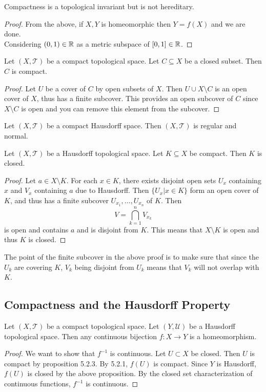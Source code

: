 \documentclass[a4paper]{article}
\begin{document}
\begin{lmm}{}{} Compactness is a topological invariant but is not hereditary. 
\begin{proof}
From the above, if $X,Y$ is homeomorphic then $Y=f(X)$ and we are done. \\
Considering $(0,1)\in\mathbb{R}$ as a metric subspace of $[0,1]\in\mathbb{R}$. 
\end{proof}
\end{lmm}

\begin{prp}{}{} Let $(X,\mathcal{T})$ be a compact topological space. Let $C\subseteq X$ be a closed subset. Then $C$ is compact. 
\begin{proof}
Let $U$ be a cover of $C$ by open subsets of $X$. Then $U\cup X\setminus C$ is an open cover of $X$, thus has a finite subcover. This provides an open subcover of $C$ since $X\setminus C$ is open and you can remove this element from the subcover. 
\end{proof}
\end{prp}

\begin{prp}{}{} Let $(X,\mathcal{T})$ be a compact Hausdorff space. Then $(X,\mathcal{T})$ is regular and normal. 
\end{prp}

\begin{prp}{}{} Let $(X,\mathcal{T})$ be a Hausdorff topological space. Let $K\subseteq X$ be compact. Then $K$ is closed. 
\begin{proof}
Let $a\in X\setminus K$. For each $x\in K$, there exists disjoint open sets $U_x$ containing $x$ and $V_x$ containing $a$ due to Hausdorff. Then $\{U_x|x\in K\}$ form an open cover of $K$, and thus has a finite subcover $U_{x_1},\dots,U_{x_n}$ of $K$. Then $$V=\bigcap_{k=1}^nV_{x_k}$$ is open and contains $a$ and is disjoint from $K$. This means that $X\setminus K$ is open and thus $K$ is closed. 
\end{proof}
\end{prp}

The point of the finite subcover in the above proof is to make sure that since the $U_k$ are covering $K$, $V_k$ being disjoint from $U_k$ means that $V_k$ will not overlap with $K$. 

\subsection{Compactness and the Hausdorff Property}
\begin{prp}{}{} Let $(X,\mathcal{T})$ be a compact topological space. Let $(Y,\mathcal{U})$ be a Hausdorff topological space. Then any continuous bijection $f:X\to Y$ is a homeomorphism. 
\begin{proof}
We want to show that $f^{-1}$ is continuous. Let $U\subset X$ be closed. Then $U$ is compact by proposition 5.2.3. By 5.2.1, $f(U)$ is compact. Since $Y$ is Hausdorff, $f(U)$ is closed by the above proposition. By the closed set characterization of continuous functions, $f^{-1}$ is continuous. 
\end{proof}
\end{prp}
\end{document}

